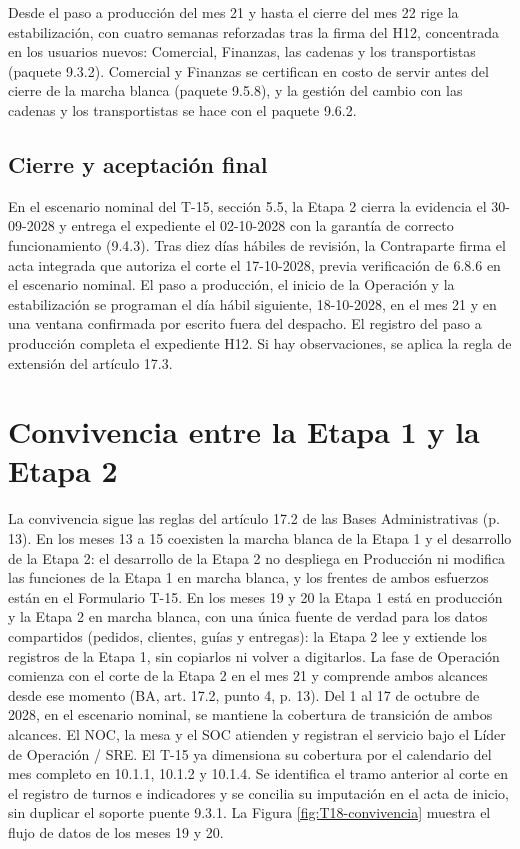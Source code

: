 Desde el paso a producción del mes 21 y hasta el cierre del mes 22 rige la estabilización, con cuatro semanas reforzadas tras la firma del H12, concentrada en los usuarios nuevos: Comercial, Finanzas, las cadenas y los transportistas (paquete 9.3.2). Comercial y Finanzas se certifican en costo de servir antes del cierre de la marcha blanca (paquete 9.5.8), y la gestión del cambio con las cadenas y los transportistas se hace con el paquete 9.6.2.

\subsection{Cierre y aceptación final}

En el escenario nominal del T-15, sección 5.5, la Etapa 2 cierra la evidencia el 30-09-2028 y entrega el expediente el 02-10-2028 con la garantía de correcto funcionamiento (9.4.3). Tras diez días hábiles de revisión, la Contraparte firma el acta integrada que autoriza el corte el 17-10-2028, previa verificación de 6.8.6 en el escenario nominal. El paso a producción, el inicio de la Operación y la estabilización se programan el día hábil siguiente, 18-10-2028, en el mes 21 y en una ventana confirmada por escrito fuera del despacho. El registro del paso a producción completa el expediente H12. Si hay observaciones, se aplica la regla de extensión del artículo 17.3.

\section{Convivencia entre la Etapa 1 y la Etapa 2}

La convivencia sigue las reglas del artículo 17.2 de las Bases Administrativas (p. 13). En los meses 13 a 15 coexisten la marcha blanca de la Etapa 1 y el desarrollo de la Etapa 2: el desarrollo de la Etapa 2 no despliega en Producción ni modifica las funciones de la Etapa 1 en marcha blanca, y los frentes de ambos esfuerzos están en el Formulario T-15. En los meses 19 y 20 la Etapa 1 está en producción y la Etapa 2 en marcha blanca, con una única fuente de verdad para los datos compartidos (pedidos, clientes, guías y entregas): la Etapa 2 lee y extiende los registros de la Etapa 1, sin copiarlos ni volver a digitarlos. La fase de Operación comienza con el corte de la Etapa 2 en el mes 21 y comprende ambos alcances desde ese momento (BA, art. 17.2, punto 4, p. 13). Del 1 al 17 de octubre de 2028, en el escenario nominal, se mantiene la cobertura de transición de ambos alcances. El NOC, la mesa y el SOC atienden y registran el servicio bajo el Líder de Operación / SRE. El T-15 ya dimensiona su cobertura por el calendario del mes completo en 10.1.1, 10.1.2 y 10.1.4. Se identifica el tramo anterior al corte en el registro de turnos e indicadores y se concilia su imputación en el acta de inicio, sin duplicar el soporte puente 9.3.1. La Figura \ref{fig:T18-convivencia} muestra el flujo de datos de los meses 19 y 20.

